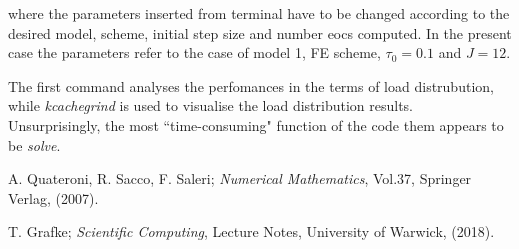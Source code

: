 \documentclass[11pt]{article}
\theoremstyle{theorem}
\theoremstyle{definition}
\begin{document}
where the parameters inserted from terminal have to be changed according to the desired model, scheme, initial step size and number eocs computed. In the present case the parameters refer to the case of model 1, FE scheme, $\tau_0=0.1$ and $J=12$.  

The first command analyses the perfomances in the terms of load distrubution, while \emph{kcachegrind} is used to visualise the load distribution results.\\
Unsurprisingly, the most ``time-consuming" function of the code them appears to be \emph{solve}.\\


\cleardoublepage
\begin{thebibliography}{99}

 A. Quateroni, R. Sacco, F. Saleri;
\emph{Numerical Mathematics}, Vol.37, Springer Verlag, (2007).

 T. Grafke;
\emph{Scientific Computing}, Lecture Notes, University of Warwick, (2018).







\printindex
\end{thebibliography}
\end{document}
